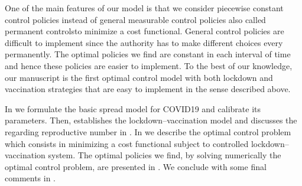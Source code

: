     One of the main features of our model is that we consider piecewise
constant control policies instead of general measurable control policies
\textemdash also called permanent controls\textemdash to minimize a cost
functional. General control policies are difficult to implement since the
authority has to make different choices every permanently. The optimal policies
we find are constant in each interval of time and hence these policies are
easier to implement. To the best of our knowledge, our manuscript is the first
optimal control model with both lockdown and vaccination strategies that are
easy to implement in the sense described above.


    In  we formulate the basic spread model for
COVID19 and calibrate its parameters. Then, 
establishes the lockdown--vaccination model and discusses the regarding
reproductive number in . In
 we describe the optimal control problem which
consists in minimizing a cost functional subject to controlled
lockdown--vaccination system. The optimal policies we find, by solving
numerically the optimal control problem, are presented in
. We conclude with some final comments in
.